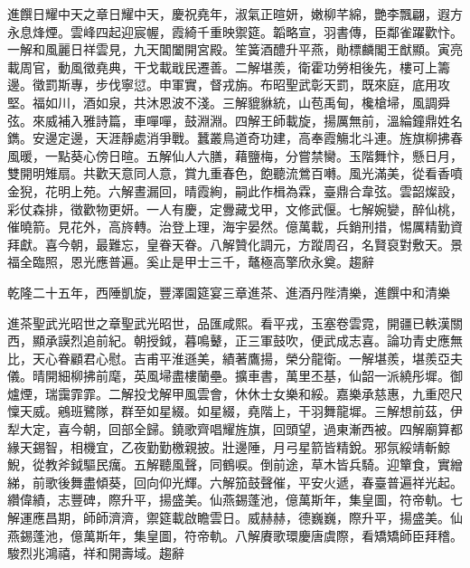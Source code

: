 \begin{pinyinscope}
進饌日耀中天之章日耀中天，慶祝堯年，淑氣正暄妍，嫩柳芊綿，艷李飄翩，遐方永息烽煙。雲峰四起迎宸幄，霞綺千重映禦筵。韜略宣，羽書傳，臣鄰雀躍歡忭。一解和風麗日祥雲見，九天閶闔開宮殿。笙簧酒醴升平燕，勛標麟閣王猷顯。寅亮載周官，動風徵堯典，干戈載戢民遷善。二解堪羨，衛霍功勞相後先，樓可上籌邊。徵罰斯專，步伐寧愆。申軍實，督戎旃。布昭聖武彰天罰，既來庭，底用攻堅。福如川，酒如泉，共沐恩波不淺。三解貔貅統，山苞禹甸，欃槍埽，風調舜弦。來威補入雅詩篇，車嘽嘽，鼓淵淵。四解王師載旋，揚厲無前，溫綸鐘鼎姓名鐫。安邊定邊，天涯靜處消爭戰。蠶叢鳥道奇功建，高奉霞觴北斗連。旌旗柳拂春風暖，一點葵心傍日暄。五解仙人六膳，藉鹽梅，分嘗禁臠。玉階舞忭，懸日月，雙開明雉扇。共歡天意同人意，賞九重春色，飽聽流鶯百囀。風光滿美，從看香噴金猊，花明上苑。六解晝漏回，晴霞絢，嗣此作楫為霖，臺鼎合韋弦。雲韶燦設，彩仗森排，徵歡物更妍。一人有慶，定釁藏戈甲，文修武偃。七解婉孌，醉仙桃，催曉箭。見花外，高旍轉。治登上理，海宇晏然。億萬載，兵銷刑措，惕厲精勤資拜獻。喜今朝，最難忘，皇眷天眷。八解贊化調元，方蹤周召，名賢裒對敷天。景福全臨照，恩光應普遍。奚止是甲士三千，鼇極高擎欣永奠。趨辭

乾隆二十五年，西陲凱旋，豐澤園筵宴三章進茶、進酒丹陛清樂，進饌中和清樂

進茶聖武光昭世之章聖武光昭世，品匯咸熙。看平戎，玉塞卷雲霓，開疆已軼漢關西，顯承謨烈追前紀。朝授鉞，暮鳴鼙，正三軍鼓吹，便武成志喜。論功青史應無比，天心眷顧君心慰。吉甫平淮遜美，績著鷹揚，榮分龍衛。一解堪羨，堪羨亞夫儀。晴開細柳拂前麾，英風埽盡樓蘭壘。擴車書，萬里丕基，仙韶一派繞彤墀。御爐煙，瑞靄霏霏。二解投戈解甲風雲會，休休士女樂和綏。嘉樂承慈惠，九重咫尺懍天威。鵷班鷺隊，群至如星綴。如星綴，堯階上，干羽舞龍墀。三解想前茲，伊犁大定，喜今朝，回部全歸。鐃歌齊唱耀旌旗，回頭望，過東漸西被。四解廟算都緣天錫智，相機宜，乙夜勤勤檄親披。壯邊陲，月弓星箭皆精銳。邪氛綏靖斬鯨鯢，從教斧鉞驅民癘。五解聽風聲，同鶴唳。倒前途，草木皆兵騎。迎簞食，實繒綈，前歌後舞盡傾葵，回向仰光輝。六解笳鼓聲催，平安火遞，春臺普遍祥光起。纘偉績，志豐碑，際升平，揚盛美。仙燕錫蓬池，億萬斯年，集皇圖，符帝軌。七解運應昌期，師師濟濟，禦筵載啟瞻雲日。威赫赫，德巍巍，際升平，揚盛美。仙燕錫蓬池，億萬斯年，集皇圖，符帝軌。八解賡歌環慶唐虞際，看矯矯師臣拜稽。駿烈兆鴻禧，祥和開壽域。趨辭


\end{pinyinscope}
